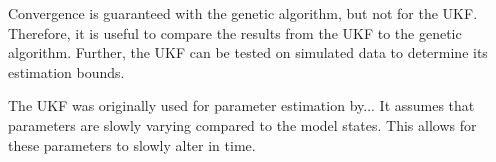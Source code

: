 Convergence is guaranteed with the genetic algorithm, but not for the UKF.
	Therefore, it is useful to compare the results from the UKF to the genetic algorithm.
	Further, the UKF can be tested on simulated data to determine its estimation bounds.
	

The UKF was originally used for parameter estimation by...
	It assumes that parameters are slowly varying compared to the model states.
	This allows for these parameters to slowly alter in time.

%
%
%
